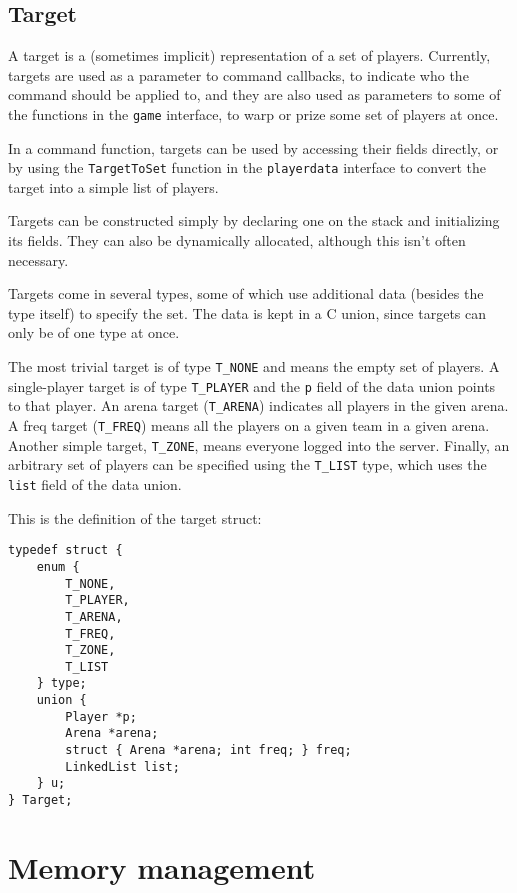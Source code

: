 \documentclass{article}
\begin{document}
\subsection{Target}

A target is a (sometimes implicit) representation of a set of players.
Currently, targets are used as a parameter to command callbacks, to
indicate who the command should be applied to, and they are also used as
parameters to some of the functions in the \verb/game/ interface, to
warp or prize some set of players at once.

In a command function, targets can be used by accessing their fields
directly, or by using the \verb/TargetToSet/ function in the
\verb/playerdata/ interface to convert the target into a simple list of
players.

Targets can be constructed simply by declaring one on the stack and
initializing its fields. They can also be dynamically allocated,
although this isn't often necessary.

Targets come in several types, some of which use additional data
(besides the type itself) to specify the set. The data is kept in a
C union, since targets can only be of one type at once.

The most trivial target is of type \verb/T_NONE/ and means the empty set
of players. A single-player target is of type \verb/T_PLAYER/ and the
\verb/p/ field of the data union points to that player. An arena target
(\verb/T_ARENA/) indicates all players in the given arena. A freq target
(\verb/T_FREQ/) means all the players on a given team in a given arena.
Another simple target, \verb/T_ZONE/, means everyone logged into the
server. Finally, an arbitrary set of players can be specified using the
\verb/T_LIST/ type, which uses the \verb/list/ field of the data union.

This is the definition of the target struct:

\begin{verbatim}
typedef struct {
    enum {
        T_NONE,
        T_PLAYER,
        T_ARENA,
        T_FREQ,
        T_ZONE,
        T_LIST
    } type;
    union {
        Player *p;
        Arena *arena;
        struct { Arena *arena; int freq; } freq;
        LinkedList list;
    } u;
} Target;
\end{verbatim}


\section{Memory management}
\end{document}
